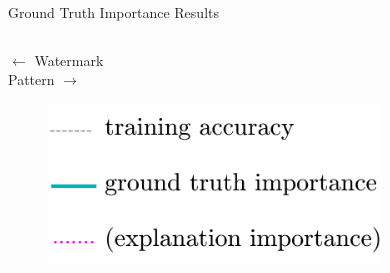\documentclass[German, aspectratio=169]{beamer}
\begin{document}
\begin{frame}[t]{Ground Truth Importance Results}
\begin{columns}
\begin{column}[t]{0.38\textwidth}
            $\leftarrow$ Watermark  \\

            Pattern $\rightarrow$\\
            \vspace{0.5cm}
            \begin{figure}
                \includegraphics[width=\textwidth]{images/compare_seeds_mac_legend.png}
            \end{figure}
        \end{column}
        \begin{column}[t]{0.3\textwidth}
            \vspace{-.8cm}
            \begin{figure}[t]
                \centering

\end{figure}
\end{column}
\end{columns}
\end{frame}
\end{document}
